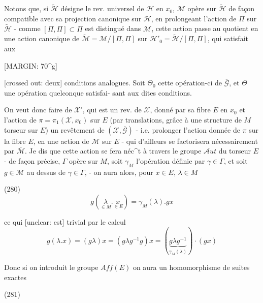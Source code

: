 Notons que, si $\tilde{\mathcal{H}}$ désigne le rev. universel de $\mathcal{H}$ en $x_0$, $\mathcal{M}$ opère sur $\tilde{\mathcal{H}}$ de façon compatible avec sa projection canonique sur $\mathcal{H}$, en prolongeant l'action de $\Pi$ sur $\tilde{\mathcal{H}}$ - comme $[\Pi,\Pi] \subset \Pi$ est distingué dans $\mathcal{M}$, cette action passe au quotient en une action canonique de $\tilde{\mathcal{M}} = \mathcal{M}/[\Pi,\Pi]$ sur $\mathcal{H}'_0 = \tilde{\mathcal{H}}/[\Pi,\Pi]$, qui satisfait aux

\newpage


[MARGIN: 70^g]

[crossed out: deux] conditions analogues. Soit $\Theta_0$ cette opération-ci
de $\overline{\mathcal{G}}$, et $\Theta$ une opération quelconque satisfai-
sant aux dites conditions.

On veut donc faire de $\mathcal{X}'$, qui est un
rev. de $\mathcal{X}$, donné par sa fibre $E$ en $x_0$
et l'action de $\pi = \pi_1(\mathcal{X}, x_0)$ sur $E$ (par
translations, grâce à une structure de
$M$ torseur sur $E$) un revêtement
de $(\mathcal{X}, \overline{\mathcal{G}})$ - i.e. prolonger l'action
donnée de $\pi$ sur la fibre $E$, en une
action de $\mathcal{M}$ sur $E$ - qui d'ailleurs
se factorisera nécessairement par $\overline{\mathcal{M}}$.
Je dis que cette action se fera néc^t à
travers le groupe $\mathcal{A}ut$ du torseur
$E$ - de façon précise, $\Gamma$ opère sur
$M$, soit $\gamma_M$ l'opération définie par $\gamma \in \Gamma$,
et soit $g \in \mathcal{M}$ au dessus de $\gamma \in \Gamma$,
- on aura alors, pour $x \in E$, $\lambda \in M$

(280) $$g(\underset{\in M}{\lambda} . \underset{\in E}{x}) = \gamma_M(\lambda) . g x$$

ce qui [unclear: est] trivial par le calcul
$$g(\lambda . x) = (g \lambda) x = (g \lambda g^{-1} g) x = (\underbrace{g \lambda g^{-1}}_{\gamma_M(\lambda)}) \cdot (g x)$$

\newpage


Donc si on introduit le groupe $Aff(E)$
on aura un homomorphisme de
suites exactes

(281)

